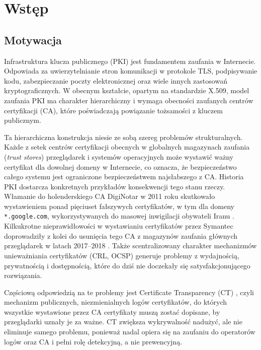 \chapter{Wstęp}
\label{ch:wstep}

\section{Motywacja}
\label{sec:motywacja}

Infrastruktura klucza publicznego (PKI) jest fundamentem zaufania w Internecie. Odpowiada za uwierzytelnianie stron komunikacji w protokole TLS, podpisywanie kodu, zabezpieczanie poczty elektronicznej oraz wiele innych zastosowań kryptograficznych. W obecnym kształcie, opartym na standardzie X.509, model zaufania PKI ma charakter hierarchiczny i wymaga obecności zaufanych centrów certyfikacji (CA), które poświadczają powiązanie tożsamości z kluczem publicznym.

Ta hierarchiczna konstrukcja niesie ze sobą szereg problemów strukturalnych. Każde z setek centrów certyfikacji obecnych w globalnych magazynach zaufania (\emph{trust stores}) przeglądarek i systemów operacyjnych \cite{mozilla-ca-list} może wystawić ważny certyfikat dla dowolnej domeny w Internecie, co oznacza, że bezpieczeństwo całego systemu jest ograniczone bezpieczeństwem najsłabszego z CA. Historia PKI dostarcza konkretnych przykładów konsekwencji tego stanu rzeczy. Włamanie do holenderskiego CA DigiNotar w 2011 roku skutkowało wystawieniem ponad pięciuset fałszywych certyfikatów, w tym dla domeny \texttt{*.google.com}, wykorzystywanych do masowej inwigilacji obywateli Iranu \cite{foxit-blacktulip}. Kilkukrotne nieprawidłowości w wystawianiu certyfikatów przez Symantec doprowadziły z kolei do usunięcia tego CA z magazynów zaufania głównych przeglądarek w latach 2017--2018 \cite{google-symantec-distrust}. Także scentralizowany charakter mechanizmów unieważniania certyfikatów (CRL, OCSP) generuje problemy z wydajnością, prywatnością i dostępnością, które do dziś nie doczekały się satysfakcjonującego rozwiązania.

Częściową odpowiedzią na te problemy jest Certificate Transparency (CT) \cite{rfc6962}, czyli mechanizm publicznych, niezmienialnych logów certyfikatów, do których wszystkie wystawione przez CA certyfikaty muszą zostać dopisane, by przeglądarki uznały je za ważne. CT zwiększa wykrywalność nadużyć, ale nie eliminuje samego problemu, ponieważ nadal opiera się na zaufaniu do operatorów logów oraz CA i pełni rolę detekcyjną, a nie prewencyjną.

